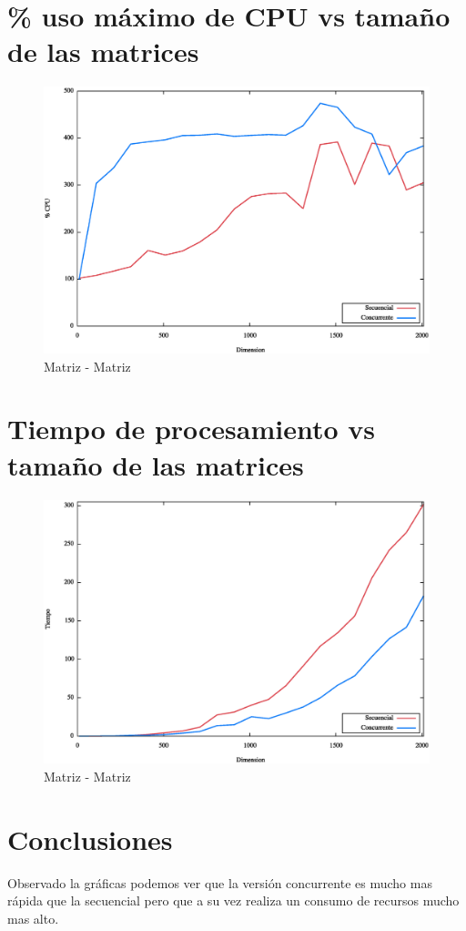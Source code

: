 \section{\% uso máximo de CPU vs tamaño de las matrices}
\begin{figure}[h]
    \centering
    \includegraphics[scale=.5]{matrizdimensiocpu.eps}
    \caption{Matriz - Matriz}
    \label{fig:digraph}
\end{figure}
\newpage
\section{Tiempo de procesamiento vs tamaño de las matrices}
\begin{figure}[h]
    \centering
    \includegraphics[scale=.5]{matrizdimensiotiempo.eps}
    \caption{Matriz - Matriz}
    \label{fig:digraph}
\end{figure}
\section{Conclusiones}
Observado la gráficas podemos ver que la versión concurrente es mucho mas rápida que la secuencial
pero que a su vez realiza un consumo de recursos mucho mas alto.
